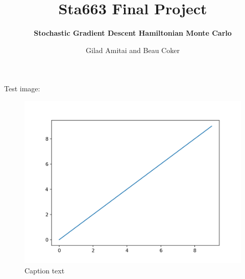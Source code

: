 \documentclass[12pt]{article}
\begin{document}
\vspace{-1in}
\title{\bf Sta663 Final Project}
\author{\bf Stochastic Gradient Descent Hamiltonian Monte Carlo}
\date{Gilad Amitai and Beau Coker}
\maketitle 
\vspace{-0.5in}

Test image:
\begin{figure}
  \includegraphics[width=\linewidth]{../Test1/Test1_fig.png}
  \caption{Caption text}
  \label{fig:fig1}
\end{figure}
\end{document}
